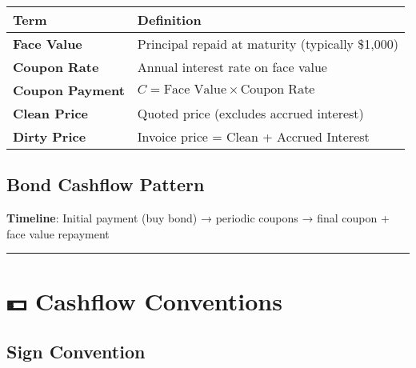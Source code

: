\documentclass[
  letterpaper,
]{scrbook}
\begin{document}
\begin{longtable}[]{@{}
  >{\raggedright\arraybackslash}p{}
  >{\raggedright\arraybackslash}p{}@{}}
\toprule\noalign{}
\begin{minipage}[b]{\linewidth}\raggedright
Term
\end{minipage} & \begin{minipage}[b]{\linewidth}\raggedright
Definition
\end{minipage} \\
\midrule\noalign{}
\endhead
\bottomrule\noalign{}
\endlastfoot
\textbf{Face Value} & Principal repaid at maturity (typically
\$1,000) \\
\textbf{Coupon Rate} & Annual interest rate on face value \\
\textbf{Coupon Payment} &
\(C = \text{Face Value} \times \text{Coupon Rate}\) \\
\textbf{Clean Price} & Quoted price (excludes accrued interest) \\
\textbf{Dirty Price} & Invoice price = Clean + Accrued Interest \\
\end{longtable}

\subsection*{Bond Cashflow Pattern}\label{bond-cashflow-pattern}

\textbf{Timeline}: Initial payment (buy bond) → periodic coupons → final
coupon + face value repayment

\begin{center}\rule{0.5\linewidth}{0.5pt}\end{center}

\section*{💵 Cashflow Conventions}\label{cashflow-conventions}


\subsection*{Sign Convention}\label{sign-convention}
\end{document}
